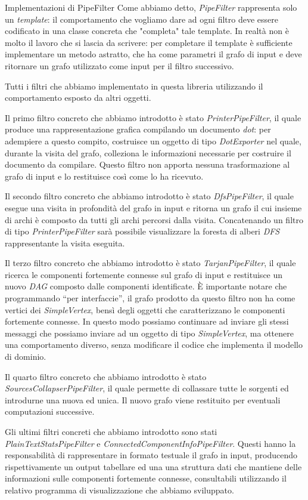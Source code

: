\begin{paragraph}{Implementazioni di PipeFilter}
  Come abbiamo detto, \emph{PipeFilter} rappresenta solo un
  \emph{template}: il comportamento che vogliamo dare ad ogni filtro
  deve essere codificato in una classe concreta che "completa" tale
  template. In realt\`a non \`e molto il lavoro che si lascia da
  scrivere: per completare il template \`e sufficiente implementare un
  metodo astratto, che ha come parametri il grafo di input e deve
  ritornare un grafo utilizzato come input per il filtro successivo.

  Tutti i filtri che abbiamo implementato in questa libreria
  utilizzando il comportamento esposto da altri oggetti.

  Il primo filtro concreto che abbiamo introdotto \`e stato
  \emph{PrinterPipeFilter}, il quale produce una rappresentazione
  grafica compilando un documento \emph{dot}: per adempiere a questo
  compito, costruisce un oggetto di tipo \emph{DotExporter} nel quale,
  durante la visita del grafo, colleziona le informazioni necessarie
  per costruire il documento da compilare. Questo filtro non apporta
  nessuna trasformazione al grafo di input e lo restituisce cos\`i
  come lo ha ricevuto.

  Il secondo filtro concreto che abbiamo introdotto \`e stato
  \emph{DfsPipeFilter}, il quale esegue una visita in profondit\`a del
  grafo in input e ritorna un grafo il cui insieme di archi \`e
  composto da tutti gli archi percorsi dalla visita. Concatenando un
  filtro di tipo \emph{PrinterPipeFilter} sar\`a possibile
  visualizzare la foresta di alberi \emph{DFS} rappresentante la
  visita eseguita.

  Il terzo filtro concreto che abbiamo introdotto \`e stato
  \emph{TarjanPipeFilter}, il quale ricerca le componenti fortemente
  connesse sul grafo di input e restituisce un nuovo \emph{DAG}
  composto dalle componenti identificate. \`E importante notare che
  programmando ``per interfaccie'', il grafo prodotto da questo filtro
  non ha come vertici dei \emph{SimpleVertex}, bens\`i degli oggetti
  che caratterizzano le componenti fortemente connesse. In questo modo
  possiamo continuare ad inviare gli stessi messaggi che possiamo
  inviare ad un oggetto di tipo \emph{SimpleVertex}, ma ottenere una
  comportamento diverso, senza modificare il codice che implementa il
  modello di dominio.

  Il quarto filtro concreto che abbiamo introdotto \`e stato
  \emph{SourcesCollapserPipeFilter}, il quale permette di collassare
  tutte le sorgenti ed introdurne una nuova ed unica. Il nuovo grafo
  viene restituito per eventuali computazioni successive.

  Gli ultimi filtri concreti che abbiamo introdotto sono stati
  \emph{PlainTextStatsPipeFilter} e
  \emph{ConnectedComponentInfoPipeFilter}. Questi hanno la
  responsabilit\`a di rappresentare in formato testuale il grafo in
  input, producendo rispettivamente un output tabellare ed una una
  struttura dati che mantiene delle informazioni sulle componenti
  fortemente connesse, consultabili utilizzando il relativo programma
  di visualizzazione che abbiamo sviluppato.

\end{paragraph}

